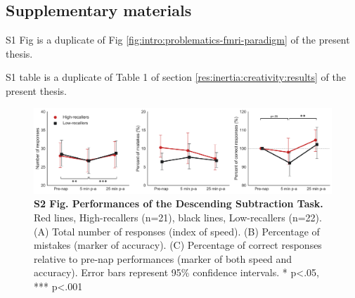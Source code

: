 \FloatBarrier

\subsection*{Supplementary materials}

S1 Fig is a duplicate of Fig \ref{fig:intro:problematics-fmri-paradigm} of the present thesis.

S1 table is a duplicate of Table 1 of section \ref{res:inertia:creativity:results} of the present thesis.

\vspace*{1cm}

\begin{figure}[!htbp]
	\includegraphics[width=\textwidth]{Fig/Results/Inertia/DRF/S2_Fig.png}
	\caption*{\textbf{S2 Fig. Performances of the Descending Subtraction Task.} Red lines, High-recallers (n=21), black lines, Low-recallers (n=22). (A) Total number of responses (index of speed). (B) Percentage of mistakes (marker of accuracy). (C) Percentage of correct responses relative to pre-nap performances (marker of both speed and accuracy). Error bars represent 95\% confidence intervals. * p<.05, *** p<.001}
\end{figure}
